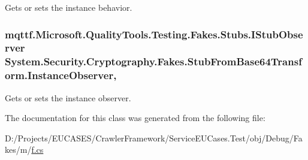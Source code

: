 Gets or sets the instance behavior.

\hypertarget{class_system_1_1_security_1_1_cryptography_1_1_fakes_1_1_stub_from_base64_transform_a4e1b3cddd638db8c355f7ed3a62e78b3}{
\subsubsection[{Instance\-Observer}]{\setlength{\rightskip}{0pt plus 5cm}mqttf.\-Microsoft.\-Quality\-Tools.\-Testing.\-Fakes.\-Stubs.\-I\-Stub\-Observer System.\-Security.\-Cryptography.\-Fakes.\-Stub\-From\-Base64\-Transform.\-Instance\-Observer\hspace{0.3cm}{\ttfamily [get]}, {\ttfamily [set]}}}\label{class_system_1_1_security_1_1_cryptography_1_1_fakes_1_1_stub_from_base64_transform_a4e1b3cddd638db8c355f7ed3a62e78b3}


Gets or sets the instance observer.



The documentation for this class was generated from the following file\-:\begin{DoxyCompactItemize}
\item 
D\-:/\-Projects/\-E\-U\-C\-A\-S\-E\-S/\-Crawler\-Framework/\-Service\-E\-U\-Cases.\-Test/obj/\-Debug/\-Fakes/m/\hyperlink{m_2f_8cs}{f.\-cs}\end{DoxyCompactItemize}
